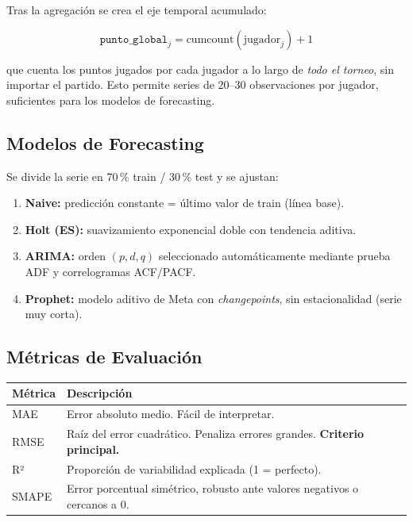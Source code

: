 \documentclass[10pt,twocolumn]{article}
\begin{document}
Tras la agregaci\'on se crea el eje temporal acumulado:

\begin{equation}
  \texttt{punto\_global}_j = \text{cumcount}(\text{jugador}_j) + 1
\end{equation}

que cuenta los puntos jugados por cada jugador a lo largo de
\textit{todo el torneo}, sin importar el partido. Esto permite series de
20--30 observaciones por jugador, suficientes para los modelos de
forecasting.

\subsection{Modelos de Forecasting}

Se divide la serie en 70\,\% train / 30\,\% test y se ajustan:

\begin{enumerate}[leftmargin=*, itemsep=0pt, topsep=2pt]
  \item \textbf{Naive:} predicci\'on constante = \'ultimo valor de train (l\'inea base).
  \item \textbf{Holt (ES):} suavizamiento exponencial doble con tendencia aditiva.
  \item \textbf{ARIMA:} orden $(p,d,q)$ seleccionado autom\'aticamente mediante
        prueba ADF y correlogramas ACF/PACF.
  \item \textbf{Prophet:} modelo aditivo de Meta con \textit{changepoints}, sin
        estacionalidad (serie muy corta).
\end{enumerate}

\subsection{Métricas de Evaluación}

\begin{center}
\small
\begin{tabular}{lp{4.8cm}}
  \toprule
  \textbf{M\'etrica} & \textbf{Descripci\'on} \\
  \midrule
  MAE   & Error absoluto medio. F\'acil de interpretar. \\
  RMSE  & Ra\'iz del error cuadr\'atico. Penaliza errores grandes. \textbf{Criterio principal.} \\
  R²    & Proporci\'on de variabilidad explicada (1 = perfecto). \\
  SMAPE & Error porcentual sim\'etrico, robusto ante valores negativos o cercanos a 0. \\
  \bottomrule
\end{tabular}
\end{center}
\end{document}
